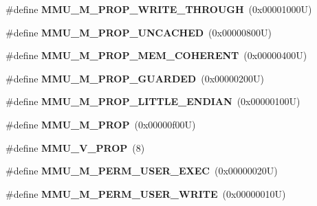 \begin{DoxyCompactItemize}
\item 
\mbox{\label{group__Virtex5MMU_ga967d05b3e012f38983e8296cec375a1b}} 
\#define {\bfseries M\+M\+U\+\_\+\+M\+\_\+\+P\+R\+O\+P\+\_\+\+W\+R\+I\+T\+E\+\_\+\+T\+H\+R\+O\+U\+GH}~(0x00001000\+U)
\item 
\mbox{\label{group__Virtex5MMU_gac670c1b1b670a3690ac4f95c9ea0246d}} 
\#define {\bfseries M\+M\+U\+\_\+\+M\+\_\+\+P\+R\+O\+P\+\_\+\+U\+N\+C\+A\+C\+H\+ED}~(0x00000800\+U)
\item 
\mbox{\label{group__Virtex5MMU_ga85dea8a59dbe31fd35cd88a1f075a3c9}} 
\#define {\bfseries M\+M\+U\+\_\+\+M\+\_\+\+P\+R\+O\+P\+\_\+\+M\+E\+M\+\_\+\+C\+O\+H\+E\+R\+E\+NT}~(0x00000400\+U)
\item 
\mbox{\label{group__Virtex5MMU_ga1851aa478354abdb7699b5aad912d2ab}} 
\#define {\bfseries M\+M\+U\+\_\+\+M\+\_\+\+P\+R\+O\+P\+\_\+\+G\+U\+A\+R\+D\+ED}~(0x00000200\+U)
\item 
\mbox{\label{group__Virtex5MMU_ga1e7efe67f0d3e6b097cf6a8effec4935}} 
\#define {\bfseries M\+M\+U\+\_\+\+M\+\_\+\+P\+R\+O\+P\+\_\+\+L\+I\+T\+T\+L\+E\+\_\+\+E\+N\+D\+I\+AN}~(0x00000100\+U)
\item 
\mbox{\label{group__Virtex5MMU_ga4eb534b0ce728f987cf098ead4720a97}} 
\#define {\bfseries M\+M\+U\+\_\+\+M\+\_\+\+P\+R\+OP}~(0x00000f00\+U)
\item 
\mbox{\label{group__Virtex5MMU_ga34b7b44b54605318f3c106ed80224bcd}} 
\#define {\bfseries M\+M\+U\+\_\+\+V\+\_\+\+P\+R\+OP}~(8)
\item 
\mbox{\label{group__Virtex5MMU_ga5ca8d28064ea994be09d435adfddb1b9}} 
\#define {\bfseries M\+M\+U\+\_\+\+M\+\_\+\+P\+E\+R\+M\+\_\+\+U\+S\+E\+R\+\_\+\+E\+X\+EC}~(0x00000020\+U)
\item 
\mbox{\label{group__Virtex5MMU_gae02b61d5134d9572e98cdda6b3c6777e}} 
\#define {\bfseries M\+M\+U\+\_\+\+M\+\_\+\+P\+E\+R\+M\+\_\+\+U\+S\+E\+R\+\_\+\+W\+R\+I\+TE}~(0x00000010\+U)
\item 
\mbox{\label{group__Virtex5MMU_gac18ced276c3e4dc4e615ec72f10e0fca}} 

\end{DoxyCompactItemize}
